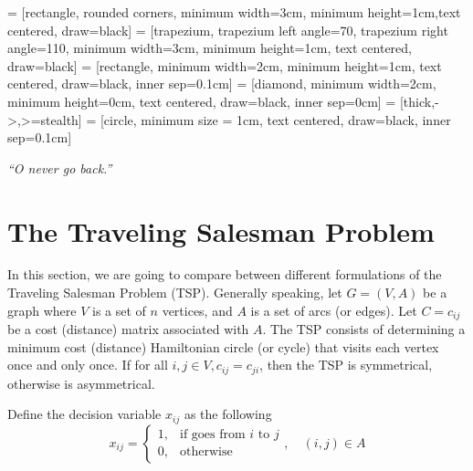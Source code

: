 
\usepackage{makecell}

\usetikzlibrary{shapes.geometric, arrows}
     = [rectangle, rounded corners, minimum width=3cm, minimum height=1cm,text centered, draw=black]
     = [trapezium, trapezium left angle=70, trapezium right angle=110, minimum width=3cm, minimum height=1cm, text centered, draw=black]
     = [rectangle, minimum width=2cm, minimum height=1cm, text centered, draw=black, inner sep=0.1cm]
     = [diamond, minimum width=2cm, minimum height=0cm, text centered, draw=black, inner sep=0cm]
     = [thick,->,>=stealth]
     = [circle, minimum size = 1cm, text centered, draw=black, inner sep=0.1cm]

\renewcommand{\docTitle}{Lecture 6 - Traveling Salesman Problem}
\renewcommand{\docAuthor}{Lan Peng, Ph.D.}
\renewcommand{\docAffil}{School of Management, Shanghai University, Shanghai, China}

    \titleSec

    \begin{center}
        \textit{``O never go back.''}
    \end{center}

    \section{The Traveling Salesman Problem}
        In this section, we are going to compare between different formulations of the Traveling Salesman Problem (TSP). Generally speaking, let $G = (V, A)$ be a graph where $V$ is a set of $n$ vertices, and $A$ is a set of arcs (or edges). Let $C = c_{ij}$ be a cost (distance) matrix associated with $A$. The TSP consists of determining a minimum cost (distance) Hamiltonian circle (or cycle) that visits each vertex once and only once. If for all $i, j \in V, c_{ij} = c_{ji}$, then the TSP is symmetrical, otherwise is asymmetrical.

        Define the decision variable $x_{ij}$ as the following
        \begin{equation}
            x_{ij} = \begin{cases}
                1, &\text{if goes from } i \text{ to } j\\ 
                0, & \text{otherwise}
            \end{cases}, \quad (i, j) \in A
        \end{equation}

